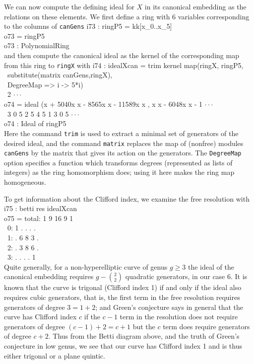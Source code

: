 We can now compute the defining ideal for $X$ in its canonical
embedding as the relations on these elements. We first define
a ring with 6 variables corresponding to the columns of {\tt canGens}
\beginOutput
i73 : ringP5 = kk[x_0..x_5]\\
\emptyLine
o73 = ringP5\\
\emptyLine
o73 : PolynomialRing\\
\endOutput
and then compute the canonical ideal as the
kernel of the corresponding map from
this ring to {\tt ringX} with
\beginOutput
i74 : idealXcan = trim kernel map(ringX, ringP5, \\
\                                     substitute(matrix canGens,ringX),\\
\                                     DegreeMap => i -> 5*i)\\
\emptyLine
\              2                                                        $\cdot\cdot\cdot$\\
o74 = ideal (x  + 5040x x  - 8565x x  - 11589x x , x x  - 6048x x  - 1 $\cdot\cdot\cdot$\\
\              3        0 5        2 5         4 5   1 3        0 5     $\cdot\cdot\cdot$\\
\emptyLine
o74 : Ideal of ringP5\\
\endOutput
Here the command {\tt trim} is used to extract a minimal set
of generators of the desired ideal, and the command {\tt matrix}
replaces the map of (nonfree) modules {\tt canGens} by the matrix that
gives its action on the generators.  The {\tt DegreeMap} option specifies a
function which transforms degrees (represented as lists of integers) as the
ring homomorphism does; using it here makes the ring map homogeneous.

To get information about the Clifford index, we examine the 
{}free resolution with
\beginOutput
i75 : betti res idealXcan\\
\emptyLine
o75 = total: 1 9 16 9 1\\
\          0: 1 .  . . .\\
\          1: . 6  8 3 .\\
\          2: . 3  8 6 .\\
\          3: . .  . . 1\\
\endOutput
Quite generally, for a non-hyperelliptic curve of genus 
$g\geq 3$ the ideal
of the canonical embedding requires ${g-\binom 2 2}$ 
quadratic generators, in our case 6. It is known that
the curve is trigonal (Clifford index 1) if and only if the
ideal also requires cubic generators, that is, the
{}first term in the free resolution requires generators of degree
$3 = 1+2$; and Green's conjecture says in general that the
curve has Clifford index $c$ if the $c-1$ term in the
resolution does not require generators of degree
$(c-1)+2 = c+1$ but the $c$ term does require generators
of degree $c+2$. Thus from the Betti diagram above, and
the truth of Green's conjecture in low genus, we
see that our curve has Clifford index 1 and is thus either
trigonal or a plane quintic. 

